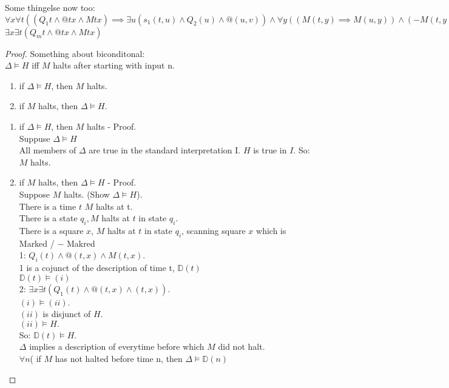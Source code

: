 Some thingelse now too:\\
$\forall x \forall t ((Q_1 t \wedge @tx \wedge Mtx ) \implies \exists u ( s_1 (t , u) \wedge Q_2(u) \wedge @ (u,v)) \wedge \forall y ((M(t,y) \implies M(u,y)) \wedge (-M(t,y) \implies - M(u,y)))))$ \\
$\exists x \exists t ( Q_mt \wedge @tx \wedge Mtx)$\\


\begin{proof}
Something about biconditonal:\\
$\Delta \vDash H$ iff $M$ halts after starting with input n.
\begin{enumerate}
\item if $\Delta \vDash H$, then $M$ halts.
\item if $M$ halts, then $\Delta \vDash H$.
\end{enumerate}
\begin{enumerate}
\item if $\Delta \vDash H$, then $M$ halts - Proof. \\
Suppuse $\Delta \vDash H$ \\
All members of $\Delta$ are true in the standard interpretation I.
$H$ is true in $I$.
So: $M$ halts.
\item if $M$ halts, then $\Delta \vDash H$ - Proof. \\
Suppose $M$ halts. (Show $\Delta \vDash H$). \\
There is a time \underline{$t$} $M$ halts at t. \\
There is a state $q_i, M$ halts at $t$ in state $q_i$. \\
There is a square $x$, $M$ halts at $t$ in state $q_i$, scanning square $x$ which is Marked / $-$ Makred \\
1: $Q_i(t) \wedge @(t,x) \wedge M(t,x)$. \\
1 is a cojunct of the description of time t, $\mathbb{D}(t)$ \\
$\mathbb{D}(t) \vDash (i)$ \\

2: $\exists x \exists t (Q_1(t) \wedge @ (t,x) \wedge (t,x))$. \\

$(i) \vDash (ii)$. \\
$(ii)$ is disjunct of $H$. \\
$(ii) \vDash H.$ \\
So: $\mathbb{D}(t) \vDash H$. \\


$\Delta$ implies a description of everytime before which $M$ did not halt. \\
$\forall n$( if $M$ has not halted before time n, then $\Delta \vDash \mathbb{D}(n)$ \\

\end{enumerate}
\end{proof}


